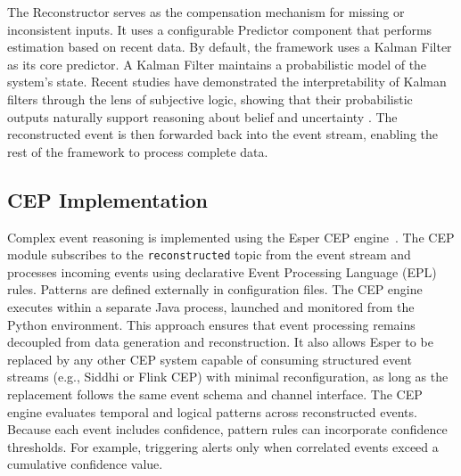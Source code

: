 The Reconstructor serves as the compensation mechanism for missing or inconsistent inputs. It uses a configurable Predictor component that performs estimation based on recent data. By default, the framework uses a Kalman Filter as its core predictor. A Kalman Filter maintains a probabilistic model of the system’s state. Recent studies have demonstrated the interpretability of Kalman filters through the lens of subjective logic, showing that their probabilistic outputs naturally support reasoning about belief and uncertainty \cite{griebel2020kalman, kang2021some}. The reconstructed event is then forwarded back into the event stream, enabling the rest of the framework to process complete data.


\subsection{CEP Implementation}
Complex event reasoning is implemented using the Esper CEP engine~\cite{esper_reference}.
The CEP module subscribes to the \texttt{reconstructed} topic from the event stream and processes incoming events using declarative Event Processing Language (EPL) rules.
Patterns are defined externally in configuration files.
The CEP engine executes within a separate Java process, launched and monitored from the Python environment.
This approach ensures that event processing remains decoupled from data generation and reconstruction.
It also allows Esper to be replaced by any other CEP system capable of consuming structured event streams (e.g., Siddhi or Flink CEP) with minimal reconfiguration, as long as the replacement follows the same event schema and channel interface.
The CEP engine evaluates temporal and logical patterns across reconstructed events. Because each event includes confidence, pattern rules can incorporate confidence thresholds. For example, triggering alerts only when correlated events exceed a cumulative confidence value.

